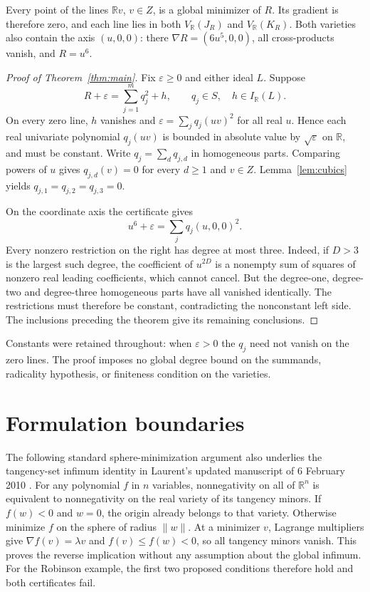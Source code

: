 \documentclass[11pt]{article}
\begin{document}
Every point of the lines $\mathbb Rv$, $v\in Z$, is a global minimizer of $R$.
Its gradient is therefore zero, and each line lies in both $V_{\mathbb R}(J_R)$
and $V_{\mathbb R}(K_R)$. Both varieties also contain the axis $(u,0,0)$:
there $\nabla R=(6u^5,0,0)$, all cross-products vanish, and $R=u^6$.

\begin{proof}[Proof of Theorem~\ref{thm:main}]
Fix $\varepsilon\ge0$ and either ideal $L$. Suppose
\[
 R+\varepsilon=\sum_{j=1}^m q_j^2+h,
 \qquad q_j\in S,\quad h\in I_{\mathbb R}(L).
\]
On every zero line, $h$ vanishes and
$\varepsilon=\sum_j q_j(uv)^2$ for all real $u$. Hence each real univariate
polynomial $q_j(uv)$ is bounded in absolute value by $\sqrt\varepsilon$ on
$\mathbb R$, and must be constant. Write $q_j=\sum_d q_{j,d}$ in homogeneous
parts. Comparing powers of $u$ gives $q_{j,d}(v)=0$ for every $d\ge1$ and
$v\in Z$. Lemma~\ref{lem:cubics} yields
$q_{j,1}=q_{j,2}=q_{j,3}=0$.

On the coordinate axis the certificate gives
\[
 u^6+\varepsilon=\sum_j q_j(u,0,0)^2.
\]
Every nonzero restriction on the right has degree at most three. Indeed, if
$D>3$ is the largest such degree, the coefficient of $u^{2D}$ is a nonempty
sum of squares of nonzero real leading coefficients, which cannot cancel.
But the degree-one, degree-two and degree-three homogeneous parts have all
vanished identically. The restrictions must therefore be constant, contradicting
the nonconstant left side. The inclusions preceding the theorem give its
remaining conclusions.
\end{proof}
Constants were retained throughout: when $\varepsilon>0$ the $q_j$ need not
vanish on the zero lines. The proof imposes no global degree bound on the
summands, radicality hypothesis, or finiteness condition on the varieties.

\section{Formulation boundaries}
The following standard sphere-minimization argument also underlies the
tangency-set infimum identity in Laurent's updated manuscript of 6 February
2010 \cite[Section~7.2.3, Lemma~7.21, manuscript pp.~117--118]{laurent}.
For any polynomial $f$ in $n$ variables, nonnegativity on all of $\mathbb R^n$
is equivalent to nonnegativity on the real variety of its tangency minors.
If $f(w)<0$ and $w=0$, the origin already belongs to that variety. Otherwise
minimize $f$ on the sphere of radius $\|w\|$. At a minimizer $v$, Lagrange
multipliers give $\nabla f(v)=\lambda v$ and $f(v)\le f(w)<0$, so all tangency
minors vanish. This proves the reverse implication without any assumption
about the global infimum. For the Robinson example, the first two proposed
conditions therefore hold and both certificates fail.
\end{document}
